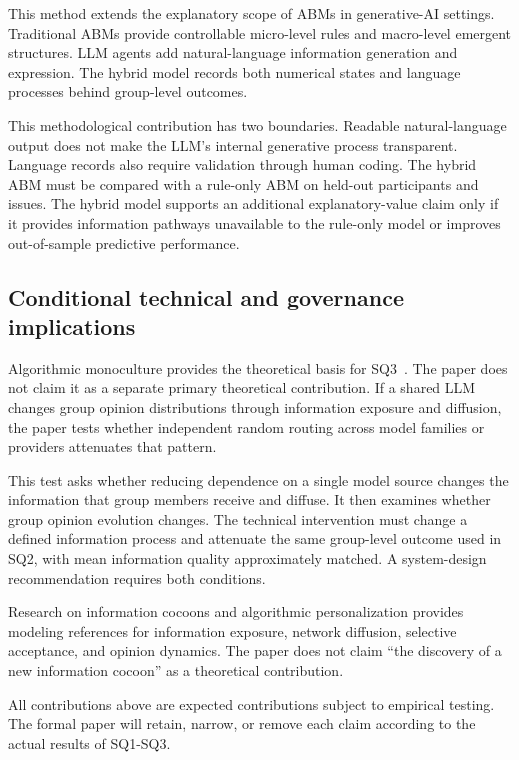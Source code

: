 \documentclass[11pt,a4paper]{article}
\begin{document}
This method extends the explanatory scope of ABMs in generative-AI settings. Traditional ABMs provide controllable micro-level rules and macro-level emergent structures. LLM agents add natural-language information generation and expression. The hybrid model records both numerical states and language processes behind group-level outcomes.

This methodological contribution has two boundaries. Readable natural-language output does not make the LLM's internal generative process transparent. Language records also require validation through human coding. The hybrid ABM must be compared with a rule-only ABM on held-out participants and issues. The hybrid model supports an additional explanatory-value claim only if it provides information pathways unavailable to the rule-only model or improves out-of-sample predictive performance.

\subsection{Conditional technical and governance implications}

Algorithmic monoculture provides the theoretical basis for SQ3~\citep{kleinberg2021}. The paper does not claim it as a separate primary theoretical contribution. If a shared LLM changes group opinion distributions through information exposure and diffusion, the paper tests whether independent random routing across model families or providers attenuates that pattern.

This test asks whether reducing dependence on a single model source changes the information that group members receive and diffuse. It then examines whether group opinion evolution changes. The technical intervention must change a defined information process and attenuate the same group-level outcome used in SQ2, with mean information quality approximately matched. A system-design recommendation requires both conditions.

Research on information cocoons and algorithmic personalization provides modeling references for information exposure, network diffusion, selective acceptance, and opinion dynamics. The paper does not claim ``the discovery of a new information cocoon'' as a theoretical contribution.

All contributions above are expected contributions subject to empirical testing. The formal paper will retain, narrow, or remove each claim according to the actual results of SQ1-SQ3.
\end{document}
